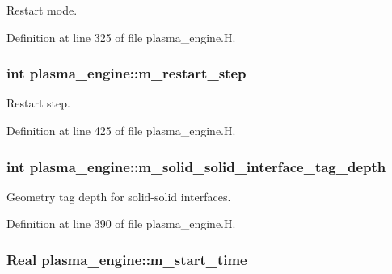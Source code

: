 Restart mode. 



Definition at line 325 of file plasma\+\_\+engine.\+H.

\subsubsection[{\texorpdfstring{m\+\_\+restart\+\_\+step}{m_restart_step}}]{\setlength{\rightskip}{0pt plus 5cm}int plasma\+\_\+engine\+::m\+\_\+restart\+\_\+step\hspace{0.3cm}{\ttfamily [protected]}}\hypertarget{classplasma__engine_a7323b9b5c2fd0bbb24b6ed7025054abe}{}\label{classplasma__engine_a7323b9b5c2fd0bbb24b6ed7025054abe}


Restart step. 



Definition at line 425 of file plasma\+\_\+engine.\+H.

\subsubsection[{\texorpdfstring{m\+\_\+solid\+\_\+solid\+\_\+interface\+\_\+tag\+\_\+depth}{m_solid_solid_interface_tag_depth}}]{\setlength{\rightskip}{0pt plus 5cm}int plasma\+\_\+engine\+::m\+\_\+solid\+\_\+solid\+\_\+interface\+\_\+tag\+\_\+depth\hspace{0.3cm}{\ttfamily [protected]}}\hypertarget{classplasma__engine_a646e86d966b6937ca34f9c14650ae348}{}\label{classplasma__engine_a646e86d966b6937ca34f9c14650ae348}


Geometry tag depth for solid-\/solid interfaces. 



Definition at line 390 of file plasma\+\_\+engine.\+H.

\subsubsection[{\texorpdfstring{m\+\_\+start\+\_\+time}{m_start_time}}]{\setlength{\rightskip}{0pt plus 5cm}Real plasma\+\_\+engine\+::m\+\_\+start\+\_\+time\hspace{0.3cm}{\ttfamily [protected]}}\hypertarget{classplasma__engine_a8f99fe79d7b66c655eb11ed3fdac5e2b}{}\label{classplasma__engine_a8f99fe79d7b66c655eb11ed3fdac5e2b}


